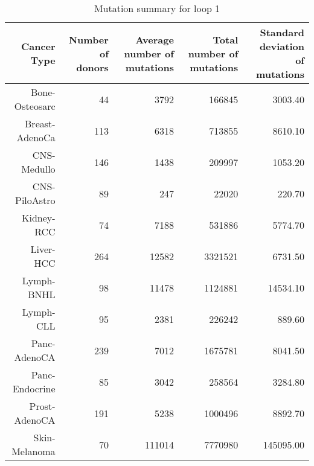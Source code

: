 \begin{table}[hp!]
\centering
\caption{Mutation summary for loop 1}
\label{tab:mutation_summary}
\begin{tabulary}{\textwidth}{ rRRRR }
\hline
\bf{Cancer Type} & \bf{Number of donors} & \bf{Average number of mutations} & \bf{Total number of mutations} & \bf{Standard deviation of mutations} \\
\hline
  Bone-Osteosarc &               44 &                   3792 &                    166845 &                       3003.40 \\
  Breast-AdenoCa &              113 &                   6318 &                    713855 &                       8610.10 \\
     CNS-Medullo &              146 &                   1438 &                    209997 &                       1053.20 \\
   CNS-PiloAstro &               89 &                    247 &                     22020 &                        220.70 \\
      Kidney-RCC &               74 &                   7188 &                    531886 &                       5774.70 \\
       Liver-HCC &              264 &                  12582 &                   3321521 &                       6731.50 \\
      Lymph-BNHL &               98 &                  11478 &                   1124881 &                      14534.10 \\
       Lymph-CLL &               95 &                   2381 &                    226242 &                        889.60 \\
    Panc-AdenoCA &              239 &                   7012 &                   1675781 &                       8041.50 \\
  Panc-Endocrine &               85 &                   3042 &                    258564 &                       3284.80 \\
   Prost-AdenoCA &              191 &                   5238 &                   1000496 &                       8892.70 \\
   Skin-Melanoma &               70 &                 111014 &                   7770980 &                     145095.00 \\
\hline
\end{tabulary}
\end{table}
